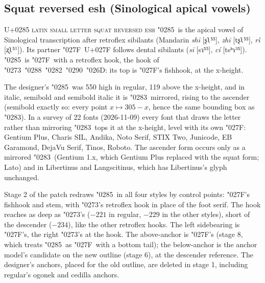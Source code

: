 \documentclass[landscape]{article}
\begin{document}

\clearpage

\subsection*{Squat reversed esh (Sinological apical vowels)}

U+0285 \textsc{latin small letter squat reversed esh} \char"0285\ is the apical vowel of Sinological transcription after retroflex sibilants (Mandarin \emph{shī} [ʂʅ⁵⁵], \emph{zhī} [tʂʅ⁵⁵], \emph{rì} [ʐʅ⁵¹]).
Its partner \char"027F\ U+027F follows dental sibilants (\emph{sī} [sɿ⁵⁵], \emph{cí} [tsʰɿ³⁵]).
\char"0285\ is \char"027F\ with a retroflex hook, the hook of \char"0273\ \char"0288\ \char"0282\ \char"0290\ \char"026D: its top is \char"027F's fishhook, at the x-height.

The designer's \char"0285\ was 550 high in regular, 119 above the x-height, and in italic, semibold and semibold italic it is \char"0283\ mirrored, rising to the ascender (semibold exactly so: every point $x \mapsto 305 - x$, hence the same bounding box as \char"0283).
In a survey of 22 fonts (2026-11-09) every font that draws the letter rather than mirroring \char"0283\ tops it at the x-height, level with its own \char"027F: Gentium Plus, Charis SIL, Andika, Noto Serif, STIX Two, Junicode, EB Garamond, DejaVu Serif, Tinos, Roboto.
The ascender form occurs only as a mirrored \char"0283\ (Gentium 1.x, which Gentium Plus replaced with the squat form; Lato) and in Libertinus and Langscitinus, which has Libertinus's glyph unchanged.

Stage 2 of the patch redraws \char"0285\ in all four styles by control points: \char"027F's fishhook and stem, with \char"0273's retroflex hook in place of the foot serif.
The hook reaches as deep as \char"0273's ($-221$ in regular, $-229$ in the other styles), short of the descender ($-234$), like the other retroflex hooks.
The left sidebearing is \char"027F's, the right \char"0273's at the hook.
The above-anchor is \char"027F's (stage 8, which treats \char"0285\ as \char"027F\ with a bottom tail); the below-anchor is the anchor model's candidate on the new outline (stage 6), at the descender reference.
The designer's anchors, placed for the old outline, are deleted in stage 1, including regular's ogonek and cedilla anchors.
\end{document}
